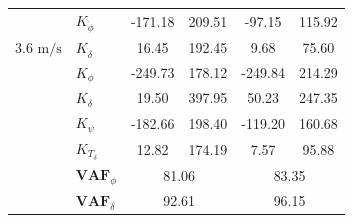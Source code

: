 \begin{table}[]
\begin{tabular}{llcccc}
                                                   & $K_{\dot{\phi}} $                                                & -171.18                                     & 209.51                                               & -97.15                                      & 115.92                                               \\
    \multirow{-2}{*}{3.6 $\si{\meter\per\second}$} & $K_{\dot{\delta}}$                                               & 16.45                                       & 192.45                                               & 9.68                                        & 75.60                                                \\
                                                   & $K_{\phi} $                                                      & -249.73                                     & 178.12                                               & -249.84                                     & 214.29                                               \\
                                                   & $K_\delta $                                                      & 19.50                                       & 397.95                                               & 50.23                                       & 247.35                                               \\
                                                   & $K_\psi $                                                        & -182.66                                     & 198.40                                               & -119.20                                     & 160.68                                               \\
                                                   & $K_{T_\delta}$                                                   & 12.82                                       & 174.19                                               & 7.57                                        & 95.88                                                \\ \cline{2-6} 
                                                   & $\mathbf{VAF}_\phi$                                              & \multicolumn{2}{c}{81.06}                                                                          & \multicolumn{2}{c}{83.35}                                                                          \\
                                                   & $\mathbf{VAF}_\delta$                                            & \multicolumn{2}{c}{92.61}                                                                          & \multicolumn{2}{c}{96.15}                                                                          \\

\end{tabular}
\end{table}
